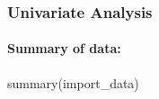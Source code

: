 \documentclass[
]{article}
\newenvironment{Shaded}{\begin{snugshade}}{\end{snugshade}}
\newcommand{\FunctionTok}[1]{\textcolor[rgb]{0.00,0.00,0.00}{#1}}
\newcommand{\NormalTok}[1]{#1}
\begin{document}
\hypertarget{univariate-analysis}{%
\subsubsection{Univariate Analysis}\label{univariate-analysis}}

\hypertarget{summary-of-data}{%
\paragraph{Summary of data:}\label{summary-of-data}}

\begin{Shaded}
\begin{Highlighting}[]
\FunctionTok{summary}\NormalTok{(import\_data)}
\end{Highlighting}
\end{Shaded}
\end{document}
